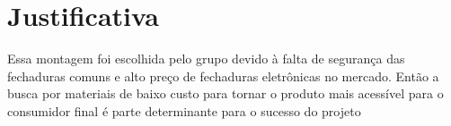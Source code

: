 \chapter{Justificativa}

Essa montagem foi escolhida pelo grupo devido à falta de segurança das
fechaduras comuns e alto preço de fechaduras eletrônicas no mercado. Então a busca por
materiais de baixo custo para tornar o produto mais acessível para o consumidor final é
parte determinante para o sucesso do projeto